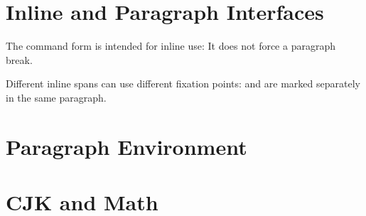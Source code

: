 \documentclass[fontset=fandol]{ctexart}
\begin{document}
\section*{Inline and Paragraph Interfaces}

The command form is intended for inline use:
It does not force a paragraph break.

Different inline spans can use different fixation points:
and
are marked separately in the same paragraph.

\section*{Paragraph Environment}

\begin{bionicpar}[fixation-point=3]
\lipsum[1]
\end{bionicpar}

\section*{CJK and Math}

\end{document}
